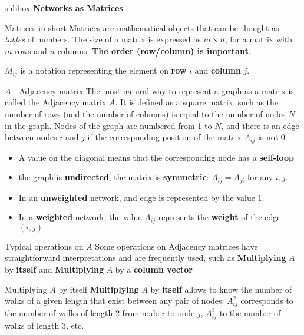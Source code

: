 \begin{subbox}{subbox}{}
  \centering
  \Large{\textbf{Networks as Matrices}}
\end{subbox}


\begin{textbox}{Matrices in short}
  Matrices are mathematical objects that can be thought as \textit{tables} of numbers. The size of a matrix is expressed as $m \times n$, for a matrix with $m$ rows and $n$ columns. \textbf{The order (row/column) is important}.

  \textbf{$M_{ij}$} is a notation representing the element on \textbf{row} $i$ and \textbf{column} $j$.

\end{textbox}


\begin{textbox}{$A$ - Adjacency matrix}
  The most natural way to represent a graph as a matrix is called the Adjacency matrix $A$. It is defined as a square matrix, such as the number of rows (and the number of columns) is equal to the number of nodes $N$ in the graph. Nodes of the graph are numbered from 1 to $N$, and there is an edge between nodes $i$ and $j$ if the corresponding position of the matrix $A_{ij}$ is not $0$.
  \begin{itemize}
    \item A value on the diagonal means that the corresponding node has a \textbf{self-loop}
    \item the graph is \textbf{undirected}, the matrix is \textbf{symmetric}: $A_{ij}=A_{ji}$ for any $i,j$.
    \item In an \textbf{unweighted} network, and edge is represented by the value $1$.
    \item In a \textbf{weighted} network, the value $A_{ij}$ represents the \textbf{weight} of the edge $(i,j)$
  \end{itemize}
\end{textbox}


\begin{textbox}{Typical operations on $A$}
  Some operations on Adjacency matrices have straightforward interpretations and are frequently used, such as \textbf{Multiplying} $A$ by \textbf{itself} and \textbf{Multiplying} $A$ by a \textbf{column vector}
\end{textbox}


\begin{textbox}{Multiplying $A$ by itself}
  \textbf{Multiplying} $A$ by \textbf{itself} allows to know the number of walks of a given length that exist between any pair of nodes: $A^2_{ij}$ corresponds to the number of walks of length 2 from node $i$ to node $j$, $A^3_{ij}$ to the number of walks of length 3, etc.
\end{textbox}


